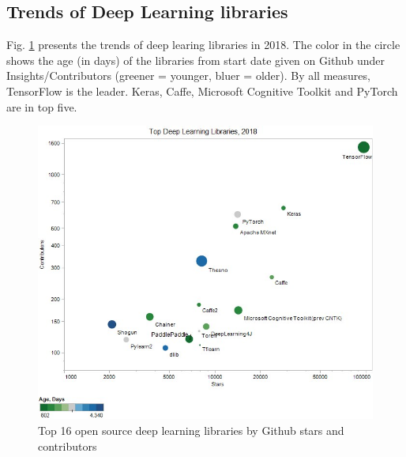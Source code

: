 \subsection{Trends of Deep Learning libraries}
Fig. \ref{figtrendslibs} presents the trends of deep learing libraries in 2018. The color in the circle shows the age (in days) of the libraries from start date given on Github under Insights/Contributors (greener = younger, bluer = older). By all measures, TensorFlow is the leader. Keras, Caffe, Microsoft Cognitive Toolkit and PyTorch are in top five.

\begin{figure}[!h]
	\centering
	\includegraphics[scale=0.65]{images/trend_deep_learning_libs_2018}
	\caption{Top 16 open source deep learning libraries by Github stars and contributors}
	\label{figtrendslibs}
\end{figure}

